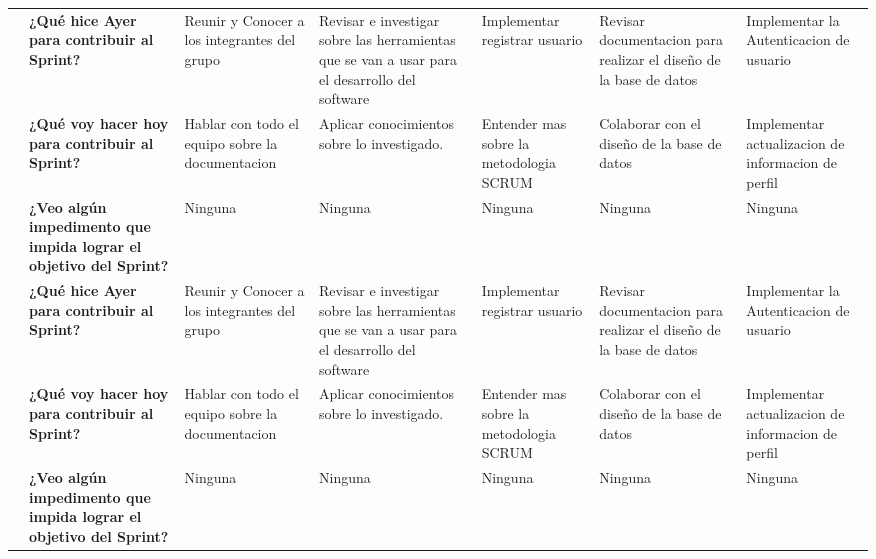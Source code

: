 \begin{longtable}{|c|P{2.5cm}|P{2cm}|P{2.5cm}|P{2.2cm}|P{2.2cm}|P{2cm}|}
    & \textbf {¿Qué hice Ayer para contribuir al Sprint?} 
    & Reunir y Conocer a los integrantes del grupo 
    & Revisar e investigar sobre las herramientas que se van a usar para el desarrollo del software 
    & Implementar registrar usuario
    & Revisar documentacion para realizar el diseño de la base de datos
    & Implementar la Autenticacion de usuario \\ 
    & \textbf {¿Qué voy hacer hoy para contribuir al Sprint?} 
    & Hablar con todo el equipo sobre la documentacion
    & Aplicar conocimientos sobre lo investigado.
    & Entender mas sobre la metodologia SCRUM
    & Colaborar con el diseño de la base de datos 
    & Implementar actualizacion  de informacion de perfil\\ 
    & \textbf {¿Veo algún impedimento que impida lograr el objetivo del Sprint?} 
    & Ninguna
    & Ninguna
    & Ninguna
    & Ninguna 
    & Ninguna\\    



    & \textbf {¿Qué hice Ayer para contribuir al Sprint?} 
    & Reunir y Conocer a los integrantes del grupo 
    & Revisar e investigar sobre las herramientas que se van a usar para el desarrollo del software 
    & Implementar registrar usuario
    & Revisar documentacion para realizar el diseño de la base de datos
    & Implementar la Autenticacion de usuario \\ 
    & \textbf {¿Qué voy hacer hoy para contribuir al Sprint?} 
    & Hablar con todo el equipo sobre la documentacion
    & Aplicar conocimientos sobre lo investigado.
    & Entender mas sobre la metodologia SCRUM
    & Colaborar con el diseño de la base de datos 
    & Implementar actualizacion  de informacion de perfil\\ 
    & \textbf {¿Veo algún impedimento que impida lograr el objetivo del Sprint?} 
    & Ninguna
    & Ninguna
    & Ninguna
    & Ninguna 
    & Ninguna\\    



\end{longtable}
